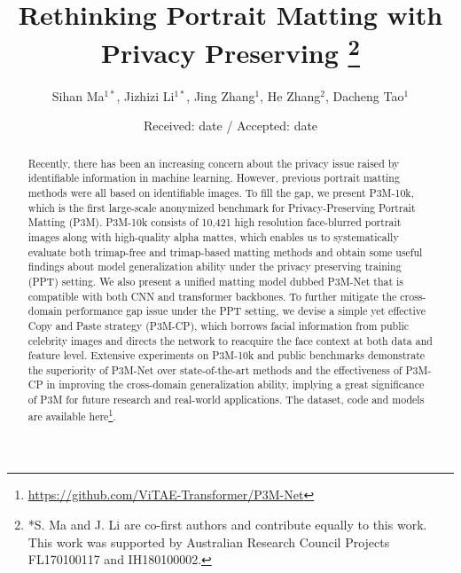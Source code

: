 \documentclass[twocolumn]{svjour3}
\begin{document}
\title{
Rethinking Portrait Matting with Privacy Preserving
\thanks{*S. Ma and J. Li are co-first authors and contribute equally to this work.\\
This work was supported by Australian Research Council Projects FL170100117 and IH180100002.}
}
\author{Sihan Ma$^{1*}$,
        Jizhizi Li$^{1*}$,
        Jing Zhang$^{1}$,
        He Zhang$^{2}$,
        Dacheng Tao$^{1}$
}


\date{Received: date / Accepted: date}


\maketitle

\begin{abstract}
Recently, there has been an increasing concern about the privacy issue raised by identifiable information in machine learning. However, previous portrait matting methods were all based on identifiable images. To fill the gap, we present P3M-10k, which is the first large-scale anonymized benchmark for Privacy-Preserving Portrait Matting (P3M). P3M-10k consists of 10,421 high resolution face-blurred portrait images along with high-quality alpha mattes, which enables us to systematically evaluate both trimap-free and trimap-based matting methods and obtain some useful findings about model generalization ability under the privacy preserving training (PPT) setting. We also present a unified matting model dubbed P3M-Net that is compatible with both CNN and transformer backbones. To further mitigate the cross-domain performance gap issue under the PPT setting, we devise a simple yet effective Copy and Paste strategy (P3M-CP), which borrows facial information from public celebrity images and directs the network to reacquire the face context at both data and feature level. Extensive experiments on P3M-10k and public benchmarks demonstrate the superiority of P3M-Net over state-of-the-art methods and the effectiveness of P3M-CP in improving the cross-domain generalization ability, implying a great significance of P3M for future research and real-world applications. The dataset, code and models are available here\footnote{\url{https://github.com/ViTAE-Transformer/P3M-Net}}.
\end{abstract}
\end{document}

